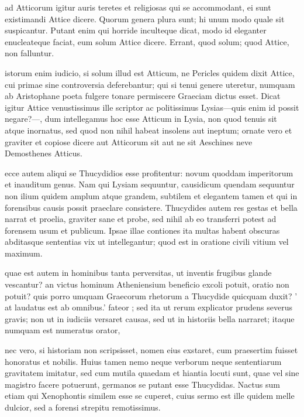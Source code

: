  ad Atticorum igitur auris teretes et religiosas qui se accommodant, ei sunt existimandi Attice dicere. Quorum genera plura sunt; hi unum modo quale sit suspicantur. Putant enim qui horride inculteque dicat, modo id eleganter enucleateque faciat, eum solum Attice dicere. Errant, quod solum; quod Attice, non falluntur.

 istorum enim iudicio, si solum illud est Atticum, ne Pericles quidem dixit Attice, cui primae sine controversia deferebantur; qui si tenui genere uteretur, numquam ab Aristophane poeta fulgere tonare permiscere Graeciam dictus esset. Dicat igitur Attice venustissimus ille scriptor ac politissimus Lysias—quis enim id possit negare?—, dum intellegamus hoc esse Atticum in Lysia, non quod tenuis sit atque inornatus, sed quod non nihil habeat insolens aut ineptum; ornate vero et graviter et copiose dicere aut Atticorum sit aut ne sit Aeschines neve Demosthenes Atticus.

 ecce autem aliqui se Thucydidios esse profitentur: novum quoddam imperitorum et inauditum genus. Nam qui Lysiam sequuntur, causidicum quendam sequuntur non ilium quidem amplum atque grandem, subtilem et elegantem tamen et qui in forensibus causis possit praeclare consistere. Thucydides autem res gestas et bella narrat et proelia, graviter sane et probe, sed nihil ab eo transferri potest ad forensem usum et publicum. Ipsae illae contiones ita multas habent obscuras abditasque sententias vix ut intellegantur; quod est in oratione civili vitium vel maximum.

 quae est autem in hominibus tanta perversitas, ut inventis frugibus glande vescantur? an victus hominum Atheniensium beneficio excoli potuit, oratio non potuit? quis porro umquam Graecorum rhetorum a Thucydide quicquam duxit? ' at laudatus est ab omnibus.' fateor ; sed ita ut rerum explicator prudens severus gravis; non ut in iudiciis versaret causas, sed ut in historiis bella narraret; itaque numquam est numeratus orator,

 nec vero, si historiam non scripsisset, nomen eius exstaret, cum praesertim fuisset honoratus et nobilis. Huius tamen nemo neque verborum neque sententiarum gravitatem imitatur, sed cum mutila quaedam et hiantia locuti sunt, quae vel sine magistro facere potuerunt, germanos se putant esse Thucydidas. Nactus sum etiam qui Xenophontis similem esse se cuperet, cuius sermo est ille quidem melle dulcior, sed a forensi strepitu remotissimus.

